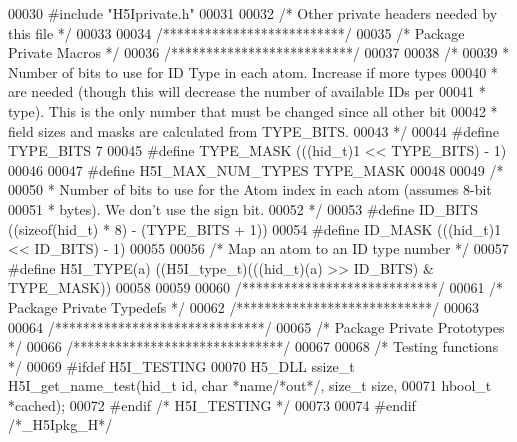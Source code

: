\begin{DoxyCode}
00030 \textcolor{preprocessor}{#include "H5Iprivate.h"}
00031 
00032 \textcolor{comment}{/* Other private headers needed by this file */}
00033 
00034 \textcolor{comment}{/**************************/}
00035 \textcolor{comment}{/* Package Private Macros */}
00036 \textcolor{comment}{/**************************/}
00037 
00038 \textcolor{comment}{/*}
00039 \textcolor{comment}{ * Number of bits to use for ID Type in each atom. Increase if more types}
00040 \textcolor{comment}{ * are needed (though this will decrease the number of available IDs per}
00041 \textcolor{comment}{ * type). This is the only number that must be changed since all other bit}
00042 \textcolor{comment}{ * field sizes and masks are calculated from TYPE\_BITS.}
00043 \textcolor{comment}{ */}
00044 \textcolor{preprocessor}{#define TYPE\_BITS   7}
00045 \textcolor{preprocessor}{#define TYPE\_MASK   (((hid\_t)1 << TYPE\_BITS) - 1)}
00046 
00047 \textcolor{preprocessor}{#define H5I\_MAX\_NUM\_TYPES TYPE\_MASK}
00048 
00049 \textcolor{comment}{/*}
00050 \textcolor{comment}{ * Number of bits to use for the Atom index in each atom (assumes 8-bit}
00051 \textcolor{comment}{ * bytes). We don't use the sign bit.}
00052 \textcolor{comment}{ */}
00053 \textcolor{preprocessor}{#define ID\_BITS     ((sizeof(hid\_t) * 8) - (TYPE\_BITS + 1))}
00054 \textcolor{preprocessor}{#define ID\_MASK     (((hid\_t)1 << ID\_BITS) - 1)}
00055 
00056 \textcolor{comment}{/* Map an atom to an ID type number */}
00057 \textcolor{preprocessor}{#define H5I\_TYPE(a) ((H5I\_type\_t)(((hid\_t)(a) >> ID\_BITS) & TYPE\_MASK))}
00058 
00059 
00060 \textcolor{comment}{/****************************/}
00061 \textcolor{comment}{/* Package Private Typedefs */}
00062 \textcolor{comment}{/****************************/}
00063 
00064 \textcolor{comment}{/******************************/}
00065 \textcolor{comment}{/* Package Private Prototypes */}
00066 \textcolor{comment}{/******************************/}
00067 
00068 \textcolor{comment}{/* Testing functions */}
00069 \textcolor{preprocessor}{#ifdef H5I\_TESTING}
00070 H5\_DLL ssize\_t H5I\_get\_name\_test(hid\_t \textcolor{keywordtype}{id}, \textcolor{keywordtype}{char} *name\textcolor{comment}{/*out*/}, \textcolor{keywordtype}{size\_t} size,
00071     hbool\_t *cached);
00072 \textcolor{preprocessor}{#endif }\textcolor{comment}{/* H5I\_TESTING */}\textcolor{preprocessor}{}
00073 
00074 \textcolor{preprocessor}{#endif }\textcolor{comment}{/*\_H5Ipkg\_H*/}\textcolor{preprocessor}{}
\end{DoxyCode}
